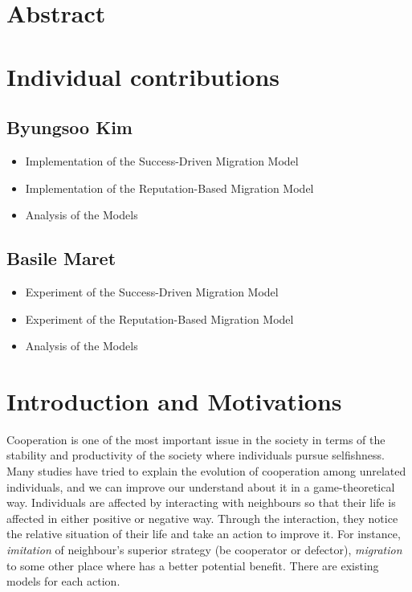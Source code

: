 \documentclass[11pt]{article}
\begin{document}
\section{Abstract}

\newpage
\section{Individual contributions}
\subsection{Byungsoo Kim}
\begin{itemize}
\item Implementation of the Success-Driven Migration Model
\item Implementation of the Reputation-Based Migration Model
\item Analysis of the Models
\end{itemize}

\subsection{Basile Maret}
\begin{itemize}
\item Experiment of the Success-Driven Migration Model
\item Experiment of the Reputation-Based Migration Model
\item Analysis of the Models
\end{itemize}

\newpage
\section{Introduction and Motivations}

Cooperation is one of the most important issue in the society in terms of the stability and productivity of the society where individuals pursue selfishness. Many studies have tried to explain the evolution of cooperation among unrelated individuals, and we can improve our understand about it in a game-theoretical way. Individuals are affected by interacting with neighbours so that their life is affected in either positive or negative way. Through the interaction, they notice the relative situation of their life and take an action to improve it. For instance, \textit{imitation} of neighbour's superior strategy (be cooperator or defector), \textit{migration} to some other place where has a better potential benefit. There are existing models for each action.
\end{document}
